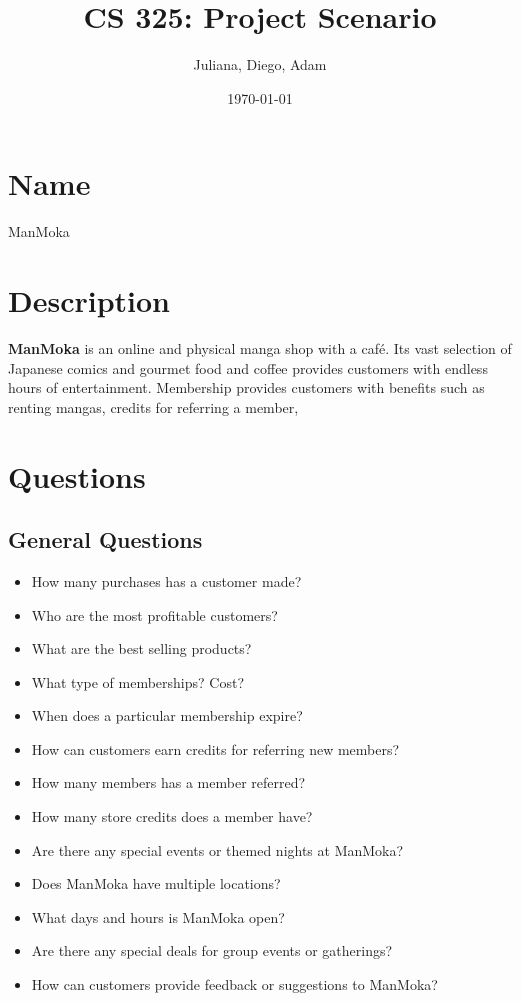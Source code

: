\documentclass{article}
\title{CS 325: Project Scenario}
\author{Juliana, Diego, Adam}
\date{\today}
\begin{document}
\maketitle

\section*{Name}
\begin{center}
        \Huge{ManMoka}
\end{center}

\section*{Description}
\textbf{ManMoka} is an online and physical manga shop with a café. Its vast selection of Japanese comics and gourmet food and coffee provides customers with endless hours of entertainment. Membership provides customers with benefits such as renting mangas, credits for referring a member,



\section*{Questions}

\subsection*{General Questions}
\begin{itemize}
\item How many purchases has a customer made?
\item Who are the most profitable customers?
\item What are the best selling products?
\item What type of memberships? Cost?
\item When does a particular membership expire?
\item How can customers earn credits for referring new members?
\item How many members has a member referred?
\item How many store credits does a member have?
\item Are there any special events or themed nights at ManMoka?
\item Does ManMoka have multiple locations?
\item What days and hours is ManMoka open?
\item Are there any special deals for group events or gatherings?
\item How can customers provide feedback or suggestions to ManMoka?
\end{itemize}
\end{document}
